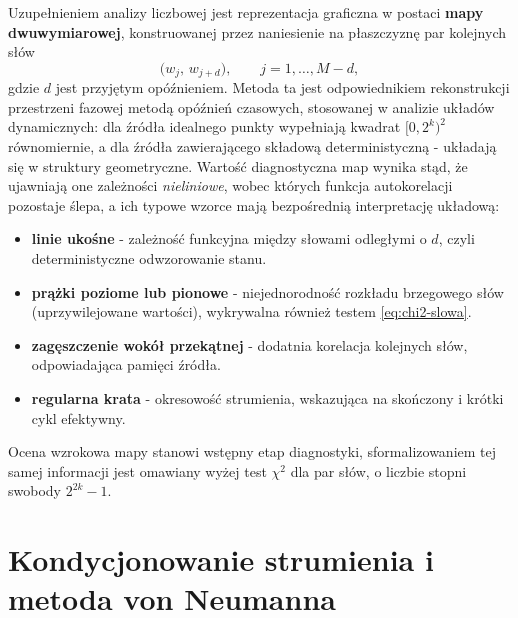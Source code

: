 Uzupełnieniem analizy liczbowej jest reprezentacja graficzna w postaci
\textbf{mapy dwuwymiarowej}, konstruowanej przez naniesienie na płaszczyznę
par kolejnych słów
%
\begin{equation}
  \big(w_j,\, w_{j+d}\big), \qquad j = 1,\dots,M-d,
  \label{eq:mapa2d}
\end{equation}
%
gdzie $d$ jest przyjętym opóźnieniem. Metoda ta jest odpowiednikiem
rekonstrukcji przestrzeni fazowej metodą opóźnień czasowych, stosowanej
w analizie układów dynamicznych: dla źródła idealnego punkty wypełniają
kwadrat $[0,2^k)^2$ równomiernie, a dla źródła zawierającego składową
deterministyczną - układają się w struktury geometryczne. Wartość
diagnostyczna map wynika stąd, że ujawniają one zależności
\emph{nieliniowe}, wobec których funkcja autokorelacji pozostaje ślepa,
a ich typowe wzorce mają bezpośrednią interpretację układową:

\begin{itemize}
  \item \textbf{linie ukośne} - zależność funkcyjna między słowami
        odległymi o $d$, czyli deterministyczne odwzorowanie stanu.
  \item \textbf{prążki poziome lub pionowe} - niejednorodność rozkładu
        brzegowego słów (uprzywilejowane wartości), wykrywalna również
        testem \eqref{eq:chi2-slowa}.
  \item \textbf{zagęszczenie wokół przekątnej} - dodatnia korelacja
        kolejnych słów, odpowiadająca pamięci źródła.
  \item \textbf{regularna krata} - okresowość strumienia, wskazująca na
        skończony i krótki cykl efektywny.
\end{itemize}

Ocena wzrokowa mapy stanowi wstępny etap diagnostyki, sformalizowaniem tej
samej informacji jest omawiany wyżej test $\chi^2$ dla par słów, o liczbie
stopni swobody $2^{2k}-1$.

\section{Kondycjonowanie strumienia i metoda von Neumanna}

